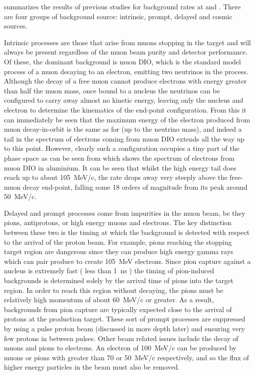 \TabBackgroundSummary%
 summarizes the results of previous studies for background rates at \phaseI and \phaseII.
There are four groups of background source: intrinsic, prompt, delayed and cosmic sources.

Intrinsic processes are those that arise from muons stopping in the target and will always be present regardless of the muon beam purity and detector performance.
Of these, the dominant background is muon \ac{DIO}, which is the standard model process of a muon decaying to an electron, emitting two neutrinos in the process.
Although the decay of a free muon cannot produce electrons with energy greater than half the muon mass, once bound to a nucleus the neutrinos can be configured to carry away almost no kinetic energy, leaving only the nucleus and electron to determine the kinematics of the end-point configuration.
From this it can immediately be seen that the maximum energy of the electron produced from muon decay-in-orbit is the same as for \mueconv (up to the neutrino mass), and indeed
a tail in the spectrum of electrons coming from muon \ac{DIO} extends all the way up to this point.
However, clearly such a configuration occupies a tiny part of the phase space as can be seen from  which shows the spectrum of electrons from muon \ac{DIO} in aluminium.
It can be seen that whilst the high energy tail does reach up to about 105~MeV/c, the rate drops away very steeply above the free-muon decay end-point, falling some 18 orders of magnitude from its peak around 50~MeV/c.
\FigDecayInOrbitSpectrum

Delayed and prompt processes come from impurities in the muon beam, be they pions, antiprotons, or high energy muons and electrons.
The key distinction between these two is the timing at which the background is detected with respect to the arrival of the proton beam.
For example, pions reaching the stopping target region are dangerous since they can produce high energy gamma rays which can pair produce to create 105~MeV electrons.
Since pion capture against a nucleus is extremely fast ( less than 1~ns ) the timing of pion-induced backgrounds is determined solely by the arrival time of pions into the target region.
In order to reach this region without decaying, the pions must be relatively high momentum of about 60~MeV/c or greater.  
As a result, backgrounds from pion capture are typically expected close to the arrival of protons at the production target.
These sort of prompt processes are suppressed by using a pulse proton beam (discussed in more depth later) and ensuring very few protons in between pulses.
Other beam related issues include the decay of muons and pions to electrons.
An electron of 100~MeV/c can be produced by muons or pions with greater than 70 or 50~MeV/c respectively, and so the flux of higher energy particles in the beam must also be removed.

